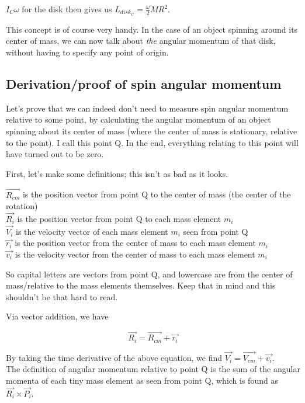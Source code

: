 $I_C \omega$ for the disk then gives us $\displaystyle L_{disk_C} = \frac{\omega}{2} M R^2$.

This concept is of course very handy. In the case of an object spinning around its center of mass, we can now talk about \emph{the} angular momentum of that disk, without having to specify any point of origin.

\subsection{Derivation/proof of spin angular momentum}

Let's prove that we can indeed don't need to measure spin angular momentum relative to some point, by calculating the angular momentum of an object spinning about its center of mass (where the center of mass is stationary, relative to the point). I call this point Q. In the end, everything relating to this point will have turned out to be zero.

First, let's make some definitions; this isn't as bad as it looks.

$\vec{R_{cm}}$ is the position vector from point Q to the center of mass (the center of the rotation)\\
$\vec{R_i}$ is the position vector from point Q to each mass element $m_i$\\
$\vec{V_i}$ is the velocity vector of each mass element $m_i$ seen from point Q\\
$\vec{r_i}$ is the position vector from the center of mass to each mass element $m_i$\\
$\vec{v_i}$ is the velocity vector from the center of mass to each mass element $m_i$

So capital letters are vectors from point Q, and lowercase are from the center of mass/relative to the mass elements themselves. Keep that in mind and this shouldn't be that hard to read.


Via vector addition, we have

\begin{equation}
\vec{R_i} = \vec{R_{cm}} + \vec{r_i}
\end{equation}

By taking the time derivative of the above equation, we find $\vec{V_i} = \vec{V_{cm}} + \vec{v_i}$.\\
The definition of angular momentum relative to point Q is the sum of the angular momenta of each tiny mass element as seen from point Q, which is found as $\vec{R_i} \times \vec{P_i}$.

